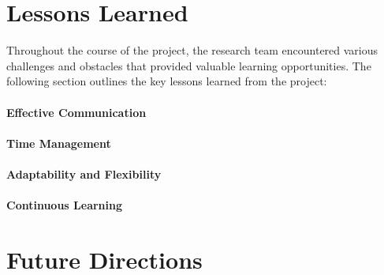 \section{Lessons Learned}

Throughout the course of the project, the research team encountered various challenges and obstacles that provided valuable learning opportunities. 
The following section outlines the key lessons learned from the project:

\paragraph{Effective Communication}

\paragraph{Time Management}

\paragraph{Adaptability and Flexibility}

\paragraph{Continuous Learning}

\section{Future Directions}%




